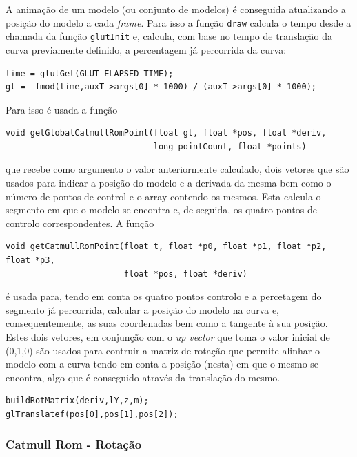 \documentclass{article}
\begin{document}
A animação de um modelo (ou conjunto de modelos) é conseguida atualizando a posição do modelo a cada \textit{frame}. Para isso a função \texttt{draw} calcula o tempo desde a chamada da função \texttt{glutInit} e, calcula, com base no tempo de translação da curva previamente definido, a percentagem já percorrida da curva:
\begin{verbatim}
time = glutGet(GLUT_ELAPSED_TIME);
gt =  fmod(time,auxT->args[0] * 1000) / (auxT->args[0] * 1000);
\end{verbatim}
Para isso é usada a função 
\begin{verbatim}
void getGlobalCatmullRomPoint(float gt, float *pos, float *deriv, 
                              long pointCount, float *points)
\end{verbatim}
que recebe como argumento o valor anteriormente calculado, dois vetores que são usados para indicar a posição do modelo e a derivada da mesma bem como o número de pontos de control e o array contendo os mesmos. Esta calcula o segmento em que o modelo se encontra e, de seguida, os quatro pontos de controlo correspondentes. 
A função
\begin{verbatim}
void getCatmullRomPoint(float t, float *p0, float *p1, float *p2, float *p3, 
                        float *pos, float *deriv)
\end{verbatim}
é usada para, tendo em conta os quatro pontos controlo e a percetagem do segmento já percorrida, calcular a posição do modelo na curva e, consequentemente, as suas coordenadas bem como a tangente à sua posição. Estes dois vetores, em conjunção com o \textit{up vector} que toma o valor inicial de (0,1,0) são usados para contruir a matriz de rotação que permite alinhar o modelo com a curva tendo em conta a posição (nesta) em que o mesmo se encontra, algo que é conseguido através da translação do mesmo.
\begin{verbatim}
buildRotMatrix(deriv,lY,z,m);
glTranslatef(pos[0],pos[1],pos[2]);
\end{verbatim}

\subsubsection{Catmull Rom - Rotação}
\end{document}
